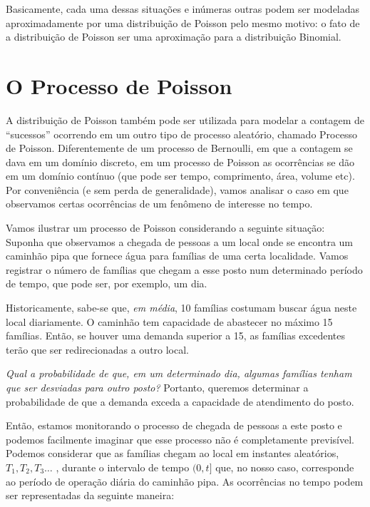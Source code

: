 \documentclass[
]{book}
\theoremstyle{definition}
\theoremstyle{definition}
\theoremstyle{definition}
\theoremstyle{remark}
\begin{document}
Basicamente, cada uma dessas situações e inúmeras outras podem ser modeladas aproximadamente por uma distribuição de Poisson pelo mesmo motivo: o fato de a distribuição de Poisson ser uma aproximação para a distribuição Binomial.

\hypertarget{o-processo-de-poisson}{%
\section{O Processo de Poisson}\label{o-processo-de-poisson}}

A distribuição de Poisson também pode ser utilizada para modelar a contagem de ``sucessos'' ocorrendo em um outro tipo de processo aleatório, chamado Processo de Poisson. Diferentemente de um processo de Bernoulli, em que a contagem se dava em um domínio discreto, em um processo de Poisson as ocorrências se dão em um domínio contínuo (que pode ser tempo, comprimento, área, volume etc). Por conveniência (e sem perda de generalidade), vamos analisar o caso em que observamos certas ocorrências de um fenômeno de interesse no tempo.

Vamos ilustrar um processo de Poisson considerando a seguinte situação: Suponha que observamos a chegada de pessoas a um local onde se encontra um caminhão pipa que fornece água para famílias de uma certa localidade. Vamos registrar o número de famílias que chegam a esse posto num determinado período de tempo, que pode ser, por exemplo, um dia.

Historicamente, sabe-se que, \emph{em média}, 10 famílias costumam buscar água neste local diariamente. O caminhão tem capacidade de abastecer no máximo 15 famílias. Então, se houver uma demanda superior a 15, as famílias excedentes terão que ser redirecionadas a outro local.

\emph{Qual a probabilidade de que, em um determinado dia, algumas famílias tenham que ser desviadas para outro posto?} Portanto, queremos determinar a probabilidade de que a demanda exceda a capacidade de atendimento do posto.

Então, estamos monitorando o processo de chegada de pessoas a este posto e podemos facilmente imaginar que esse processo não é completamente previsível. Podemos considerar que as famílias chegam ao local em instantes aleatórios, \(T_1, T_2, T_3 \ldots\) , durante o intervalo de tempo \((0, t]\) que, no nosso caso, corresponde ao período de operação diária do caminhão pipa. As ocorrências no tempo podem ser representadas da seguinte maneira:
\end{document}
